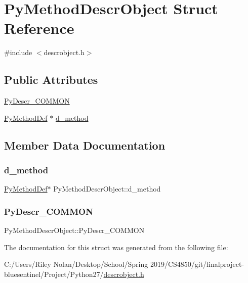 \hypertarget{struct_py_method_descr_object}{}\section{Py\+Method\+Descr\+Object Struct Reference}
\label{struct_py_method_descr_object}


{\ttfamily \#include $<$descrobject.\+h$>$}

\subsection*{Public Attributes}
\begin{DoxyCompactItemize}
\item 
\mbox{\hyperlink{struct_py_method_descr_object_acff11b21ab93f9b085260092e755d4e7}{Py\+Descr\+\_\+\+C\+O\+M\+M\+ON}}
\item 
\mbox{\hyperlink{struct_py_method_def}{Py\+Method\+Def}} $\ast$ \mbox{\hyperlink{struct_py_method_descr_object_a2ac410c4f8d6288431aa7c915d2bbf35}{d\+\_\+method}}
\end{DoxyCompactItemize}


\subsection{Member Data Documentation}
\mbox{\label{struct_py_method_descr_object_a2ac410c4f8d6288431aa7c915d2bbf35}} 
\subsubsection{\texorpdfstring{d\_method}{d\_method}}
{\footnotesize\ttfamily \mbox{\hyperlink{struct_py_method_def}{Py\+Method\+Def}}$\ast$ Py\+Method\+Descr\+Object\+::d\+\_\+method}

\mbox{\label{struct_py_method_descr_object_acff11b21ab93f9b085260092e755d4e7}} 
\subsubsection{\texorpdfstring{PyDescr\_COMMON}{PyDescr\_COMMON}}
{\footnotesize\ttfamily Py\+Method\+Descr\+Object\+::\+Py\+Descr\+\_\+\+C\+O\+M\+M\+ON}



The documentation for this struct was generated from the following file\+:\begin{DoxyCompactItemize}
\item 
C\+:/\+Users/\+Riley Nolan/\+Desktop/\+School/\+Spring 2019/\+C\+S4850/git/finalproject-\/bluesentinel/\+Project/\+Python27/\mbox{\hyperlink{descrobject_8h}{descrobject.\+h}}\end{DoxyCompactItemize}
